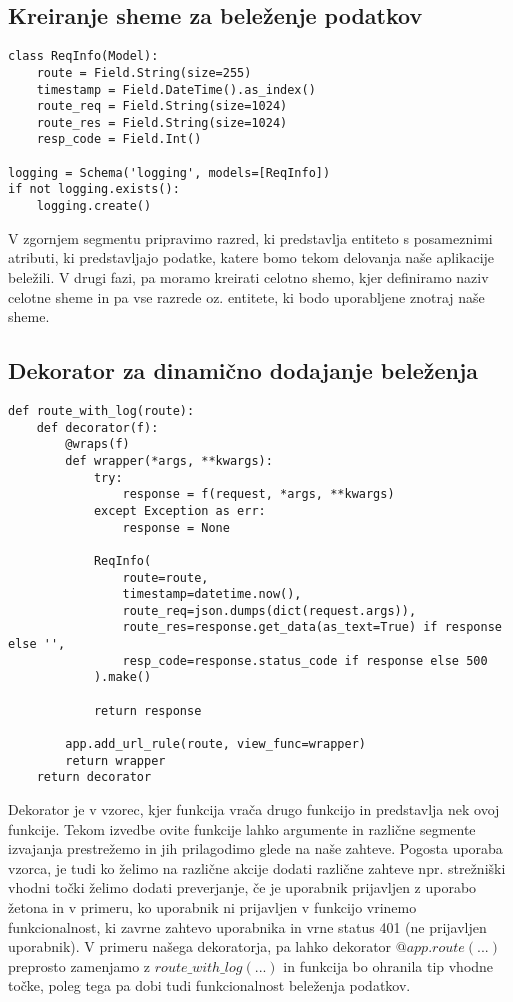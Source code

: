 \documentclass[a4paper,12pt,openright]{book}
\begin{document}
    \subsection{Kreiranje sheme za beleženje podatkov}
\begin{verbatim}
class ReqInfo(Model):
    route = Field.String(size=255)
    timestamp = Field.DateTime().as_index()
    route_req = Field.String(size=1024)
    route_res = Field.String(size=1024)
    resp_code = Field.Int()

logging = Schema('logging', models=[ReqInfo])
if not logging.exists():
    logging.create()
\end{verbatim}

    \noindent
    V zgornjem segmentu pripravimo razred, ki predstavlja entiteto s posameznimi atributi, ki predstavljajo podatke, katere bomo tekom delovanja naše aplikacije beležili. V drugi fazi, pa moramo kreirati celotno shemo, kjer definiramo naziv celotne sheme in pa vse razrede oz. entitete, ki bodo uporabljene znotraj naše sheme.

    \newpage
    \subsection{Dekorator za dinamično dodajanje beleženja}

\begin{verbatim}
def route_with_log(route):
    def decorator(f):
        @wraps(f)
        def wrapper(*args, **kwargs):
            try:
                response = f(request, *args, **kwargs)
            except Exception as err:
                response = None

            ReqInfo(
                route=route,
                timestamp=datetime.now(),
                route_req=json.dumps(dict(request.args)),
                route_res=response.get_data(as_text=True) if response else '',
                resp_code=response.status_code if response else 500
            ).make()

            return response
        
        app.add_url_rule(route, view_func=wrapper)
        return wrapper
    return decorator
\end{verbatim}

    \noindent
    Dekorator je v vzorec, kjer funkcija vrača drugo funkcijo in predstavlja nek ovoj funkcije. Tekom izvedbe ovite funkcije lahko argumente in različne segmente izvajanja prestrežemo in jih prilagodimo glede na naše zahteve. Pogosta uporaba vzorca, je tudi ko želimo na različne akcije dodati različne zahteve npr. strežniški vhodni točki želimo dodati preverjanje, če je uporabnik prijavljen z uporabo žetona in v primeru, ko uporabnik ni prijavljen v funkcijo vrinemo funkcionalnost, ki zavrne zahtevo uporabnika in vrne status 401 (ne prijavljen uporabnik). V primeru našega dekoratorja, pa lahko dekorator $@app.route(...)$ preprosto zamenjamo z $route\_with\_log(...)$ in funkcija bo ohranila tip vhodne točke, poleg tega pa dobi tudi funkcionalnost beleženja podatkov.
\end{document}
